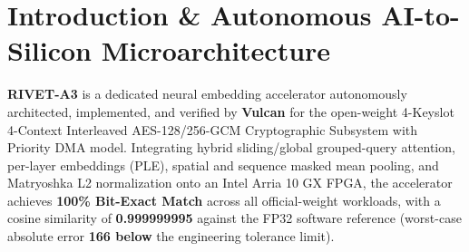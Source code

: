 \documentclass[11pt,a4paper]{article}
\begin{document}
\section{Introduction \& Autonomous AI-to-Silicon Microarchitecture}

\textbf{RIVET-A3} is a dedicated neural embedding accelerator autonomously architected, implemented, and verified by \textbf{Vulcan} for the open-weight 4-Keyslot 4-Context Interleaved AES-128/\allowbreak{}256-GCM Cryptographic Subsystem with Priority DMA model. Integrating hybrid sliding/global grouped-query attention, per-layer embeddings (PLE), spatial and sequence masked mean pooling, and Matryoshka L2 normalization onto an Intel Arria 10 GX FPGA, the accelerator achieves \textbf{100\% Bit-Exact Match} across all official-weight workloads, with a cosine similarity of \textbf{0.999999995} against the FP32 software reference (worst-case absolute error \textbf{166\texttimes{} below} the engineering tolerance limit).

\vspace{2pt}
\end{document}
